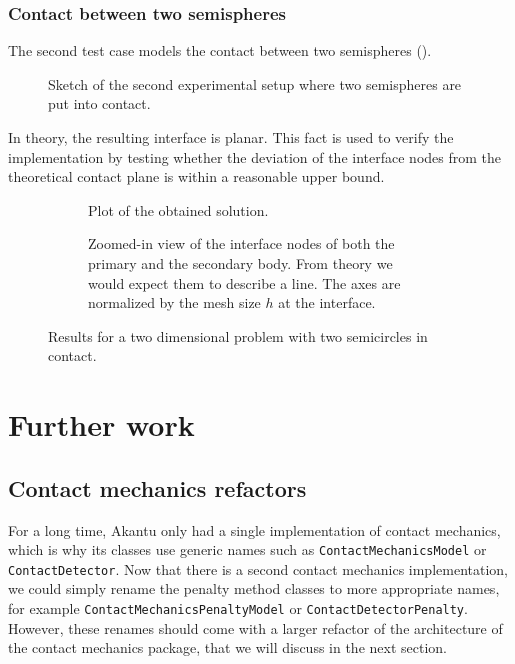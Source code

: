 \documentclass[11pt, a4paper]{article}
\begin{document}
\clearpage
\subsubsection{Contact between two semispheres}

The second test case models the contact between two semispheres (). 

\begin{figure}[H]
    \centering
    
    \caption{Sketch of the second experimental setup where two semispheres are put into contact.}
    \label{fig:sketch-sphere-sphere}
\end{figure}

In theory, the resulting interface is planar. This fact is used to verify the implementation by testing whether the deviation of the interface nodes from the theoretical contact plane is within a reasonable upper bound.

\begin{figure}[ht]
\begin{subfigure}[t]{.49\textwidth}
    \centering
    
    \caption{Plot of the obtained solution.}
    \label{fig:solution-circle-circle}
\end{subfigure}
\begin{subfigure}[t]{.49\textwidth}
    \centering
    
    \caption{Zoomed-in view of the interface nodes of both the primary and the secondary body. From theory we would expect them to describe a line. The axes are normalized by the mesh size $h$ at the interface.}
    \label{fig:zero-deviation}
\end{subfigure}
\caption{Results for a two dimensional problem with two semicircles in contact.}
\label{fig:contact-circle-circle}
\end{figure}

\clearpage
\section{Further work}
\label{sec:further}

\subsection{Contact mechanics refactors}
For a long time, Akantu only had a single implementation of contact mechanics, which is why its classes use generic names such as \texttt{ContactMechanicsModel} or \texttt{ContactDetector}. Now that there is a second contact mechanics implementation, we could simply rename the penalty method classes to more appropriate names, for example \texttt{ContactMechanicsPenaltyModel} or \texttt{ContactDetectorPenalty}. However, these renames should come with a larger refactor of the architecture of the contact mechanics package, that we will discuss in the next section.
\end{document}
